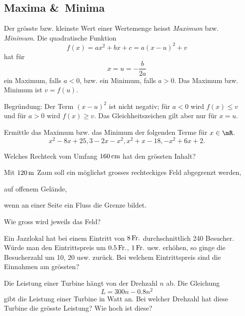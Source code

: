 \documentclass[%
11pt,%
twoside,%
titlepage,%
german,%
headsepline%
]{scrartcl}
\begin{document}
\subsection{Maxima \&\ Minima}
Der gr\"osste bzw. kleinste Wert einer Wertemenge heisst \emph{Maximum} bzw. \emph{Minimum}. Die quadratische Funktion
$$f(x)=ax^2+bx+c=a(x-u)^2+v$$
hat f\"ur
$$x =u=-\frac{b}{2a}$$
ein Maximum, falls $a<0$, bzw. ein Minimum, falls $a>0$. Das Maximum bzw. Minimum ist $v =f(u)$.

Begr\"undung: Der Term $(x - u)^2$ ist nicht negativ; f\"ur $a <0$ wird $f(x)\leq v$ und f\"ur $a > 0$ wird $f(x) \geq v$. Das Gleichheitszeichen gilt aber nur f\"ur $x =u$.

\begin{ueb}[Extremwerte]
Ermittle das Maximum bzw. das Minimum der folgenden Terme f\"ur $x\in\mR$.
$$x^2 -8x + 25, 3 - 2x - x^2, x^2 + x -18, - x^2 + 6x + 2.$$
\end{ueb}

\begin{ueb}[Maximize]
Welches Rechteck vom Umfang $\unit[160]{cm}$ hat den gr\"ossten Inhalt?
\end{ueb}

\begin{ueb}
Mit $\unit[120]{m}$ Zaun soll ein m\"oglichst grosses rechteckiges Feld abgegrenzt werden,
\begin{enumeratea}
\item auf offenem Gel\"ande,
\item wenn an einer Seite ein Fluss die Grenze bildet.
\end{enumeratea}
Wie gross wird jeweils das Feld?
\end{ueb}

\begin{ueb}
Ein Jazzlokal hat bei einem Eintritt von $\unit[8]{Fr.}$ durchschnittlich 240 Besucher. W\"urde man den Eintrittspreis um $\unit[0.5]{Fr.}$, $\unit[1]{Fr.}$ usw. erh\"ohen, so ginge die Besucherzahl um 10, 20 usw. zur\"uck. Bei welchem Eintrittspreis sind die Einnahmen am gr\"ossten?
\end{ueb}

\begin{ueb}[Turbine]
Die Leistung einer Turbine h\"angt von der Drehzahl $n$ ab. Die Gleichung
$$L = 300n - 0.8n^2$$
gibt die Leistung einer Turbine in Watt an. Bei welcher Drehzahl hat diese Turbine die gr\"osste Leistung? Wie hoch ist diese?
\end{ueb}
\end{document}
